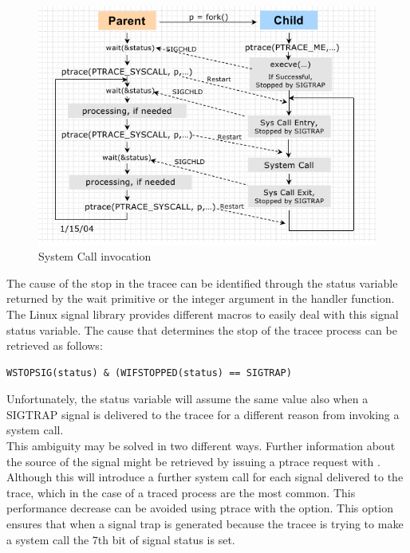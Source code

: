 \begin{figure}[h]
\centering
\includegraphics[scale=0.6]{Chapter1/Chapter1Figs/ptrace_systemcall.png} 
\caption{System Call invocation}
\label{fig:ptrace_systemCall}
\end{figure}


The cause of the stop in the tracee can be identified through the status variable returned by the wait primitive or the integer argument in the handler function.  The Linux signal library  provides different macros to easily deal with this signal status variable. The cause that determines the stop of the tracee process can be retrieved as follows:
\begin{center}
\lstset{escapechar=@,style=c}
\begin{lstlisting}[caption={Condition that identifies SIGTRAP signals}]
									WSTOPSIG(status) & (WIFSTOPPED(status) == SIGTRAP)
\end{lstlisting}
\end{center}

Unfortunately, the status variable will assume the same value also when a SIGTRAP signal is delivered to the tracee for a different reason from invoking a system call. \\
This ambiguity may be solved in two different ways. Further information about the source of the signal might be retrieved by issuing a ptrace request with .  Although this will introduce a further system call for each  signal delivered to the trace, which in the case of a traced process are the most common.  This performance decrease can be avoided using ptrace with the  option. This option ensures that when a signal trap is generated because the tracee is trying to make a system call the 7th bit of signal status is set.

